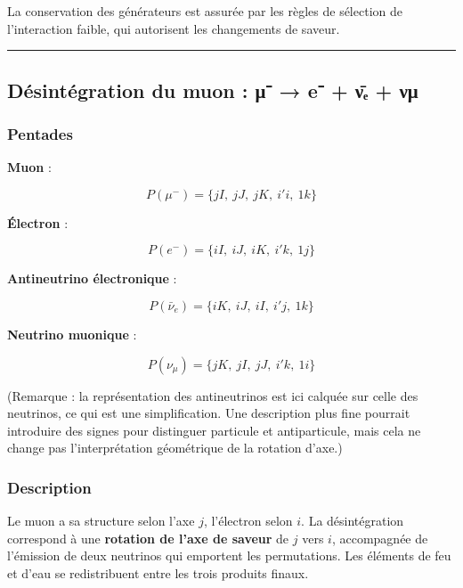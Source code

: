 \documentclass[11pt]{article}
\begin{document}
La conservation des générateurs est assurée par les règles de sélection
de l'interaction faible, qui autorisent les changements de saveur.

\begin{center}\rule{0.5\linewidth}{0.5pt}\end{center}

\hypertarget{duxe9sintuxe9gration-du-muon-ux3bc-e-ux3bdux2091-ux3bdux3bc}{%
\subsection{Désintégration du muon : μ⁻ → e⁻ + ν̄ₑ +
νμ}\label{duxe9sintuxe9gration-du-muon-ux3bc-e-ux3bdux2091-ux3bdux3bc}}

\hypertarget{pentades-1}{%
\subsubsection{Pentades}\label{pentades-1}}

\textbf{Muon} :

\[
P(\mu^-) = \{ jI,\ jJ,\ jK,\ i'i,\ 1k \}
\]

\textbf{Électron} :

\[
P(e^-) = \{ iI,\ iJ,\ iK,\ i'k,\ 1j \}
\]

\textbf{Antineutrino électronique} :

\[
P(\bar{\nu}_e) = \{ iK,\ iJ,\ iI,\ i'j,\ 1k \}
\]

\textbf{Neutrino muonique} :

\[
P(\nu_\mu) = \{ jK,\ jI,\ jJ,\ i'k,\ 1i \}
\]

(Remarque : la représentation des antineutrinos est ici calquée sur
celle des neutrinos, ce qui est une simplification. Une description plus
fine pourrait introduire des signes pour distinguer particule et
antiparticule, mais cela ne change pas l'interprétation géométrique de
la rotation d'axe.)

\hypertarget{description-1}{%
\subsubsection{Description}\label{description-1}}

Le muon a sa structure selon l'axe \(j\), l'électron selon \(i\). La
désintégration correspond à une \textbf{rotation de l'axe de saveur} de
\(j\) vers \(i\), accompagnée de l'émission de deux neutrinos qui
emportent les permutations. Les éléments de feu et d'eau se
redistribuent entre les trois produits finaux.
\end{document}
